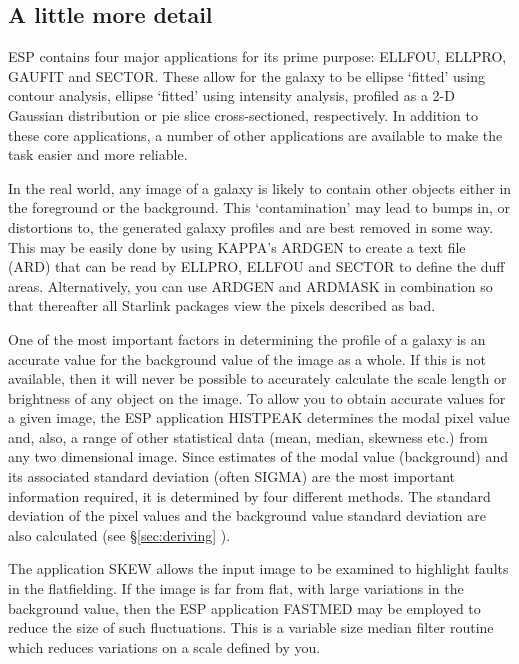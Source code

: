 \documentclass[twoside,11pt]{article}
\newcommand{\xref}[3]{#1}
\newcommand{\xlabel}[1]{}
\begin{document}
\subsection{A little more detail}
\xlabel{ALITTLEMOREDETAIL}

ESP contains four major applications for its prime purpose: ELLFOU,
ELLPRO, GAUFIT and SECTOR. These allow for the galaxy to be ellipse `fitted' 
using contour analysis, ellipse `fitted' using intensity analysis,
profiled as a 2-D Gaussian distribution or pie slice cross-sectioned, 
respectively. In addition to these core 
applications, a number of other applications are available to make the 
task easier and more reliable.

In the real world, any image of a galaxy is likely to contain other 
objects either in the foreground or the background. This `contamination'
may lead to bumps in, or distortions to, the generated galaxy profiles and
are best removed in some way. This may be easily done by 
using \xref{KAPPA}{sun95}{}'s ARDGEN to create a text file (ARD) that can be read by 
ELLPRO, ELLFOU and SECTOR to define the duff areas. Alternatively, you can 
use ARDGEN and ARDMASK in combination so that thereafter all Starlink
packages view the pixels described as bad.

One of the most important factors in determining the profile of a
galaxy is an accurate value for the background value of the image as a
whole.  If this is not available, then it will never be possible to
accurately calculate the scale length or brightness of any object on
the image.  To allow you to obtain accurate values for a given image,
the ESP application HISTPEAK determines the modal pixel value and,
also, a range of other statistical data (mean, median, skewness etc.)
from any two dimensional image. Since estimates of the modal value
(background) and its associated standard deviation (often SIGMA) are the most
important information required, it is determined by four different
methods. The standard deviation of the pixel values and the background
value standard deviation are also calculated (see \S\ref{sec:deriving} ).

The application SKEW allows the input image to be examined to highlight
faults in the flatfielding.  If the image is far from flat, with large
variations in the background value, then the ESP application FASTMED
may be employed to reduce the size of such fluctuations. This is a
variable size median filter routine which reduces variations on a scale
defined by you.
\end{document}
